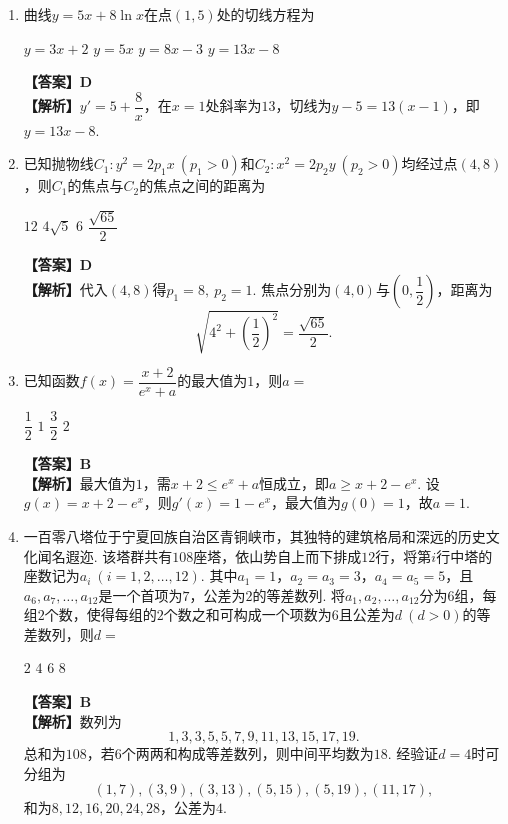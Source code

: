 \documentclass[12pt,a4paper]{article}
\begin{document}
\begin{enumerate}[leftmargin=*,label=\arabic*.,itemsep=0.8ex]
		\item 曲线$y=5x+8\ln x$在点$(1,5)$处的切线方程为
		\begin{choicesFour}
			\choice $y=3x+2$ \choice $y=5x$ \choice $y=8x-3$ \choice $y=13x-8$
		\end{choicesFour}
		\textbf{【答案】D}\\
		\textbf{【解析】}$y'=5+\dfrac8x$，在$x=1$处斜率为$13$，切线为$y-5=13(x-1)$，即$y=13x-8$.
		
		\item 已知抛物线$C_1:y^2=2p_1x\ (p_1>0)$和$C_2:x^2=2p_2y\ (p_2>0)$均经过点$(4,8)$，则$C_1$的焦点与$C_2$的焦点之间的距离为
		\begin{choicesFour}
			\choice $12$ \choice $4\sqrt5$ \choice $6$ \choice $\dfrac{\sqrt{65}}{2}$
		\end{choicesFour}
		\textbf{【答案】D}\\
		\textbf{【解析】}代入$(4,8)$得$p_1=8,\ p_2=1$. 焦点分别为$(4,0)$与$\left(0,\dfrac12\right)$，距离为
		\[
		\sqrt{4^2+\left(\frac12\right)^2}=\frac{\sqrt{65}}2.
		\]
		
		\item 已知函数$f(x)=\dfrac{x+2}{e^x+a}$的最大值为$1$，则$a=$
		\begin{choicesFour}
			\choice $\dfrac12$ \choice $1$ \choice $\dfrac32$ \choice $2$
		\end{choicesFour}
		\textbf{【答案】B}\\
		\textbf{【解析】}最大值为$1$，需$x+2\le e^x+a$恒成立，即$a\ge x+2-e^x$. 设$g(x)=x+2-e^x$，则$g'(x)=1-e^x$，最大值为$g(0)=1$，故$a=1$.
		
		\item 一百零八塔位于宁夏回族自治区青铜峡市，其独特的建筑格局和深远的历史文化闻名遐迩. 该塔群共有$108$座塔，依山势自上而下排成$12$行，将第$i$行中塔的座数记为$a_i\ (i=1,2,\dots,12)$. 其中$a_1=1$，$a_2=a_3=3$，$a_4=a_5=5$，且$a_6,a_7,\dots,a_{12}$是一个首项为$7$，公差为$2$的等差数列. 将$a_1,a_2,\dots,a_{12}$分为$6$组，每组$2$个数，使得每组的$2$个数之和可构成一个项数为$6$且公差为$d\ (d>0)$的等差数列，则$d=$
		\begin{choicesFour}
			\choice $2$ \choice $4$ \choice $6$ \choice $8$
		\end{choicesFour}
		\textbf{【答案】B}\\
		\textbf{【解析】}数列为
		\[
		1,3,3,5,5,7,9,11,13,15,17,19.
		\]
		总和为$108$，若$6$个两两和构成等差数列，则中间平均数为$18$. 经验证$d=4$时可分组为
		\[
		(1,7),(3,9),(3,13),(5,15),(5,19),(11,17),
		\]
		和为$8,12,16,20,24,28$，公差为$4$.
		

\end{enumerate}
\end{document}
